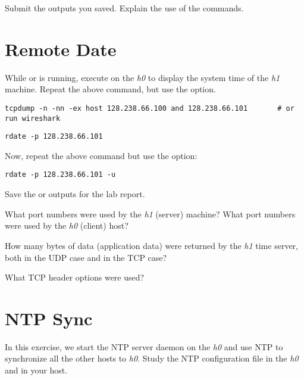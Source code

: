\documentclass{../UTNetLab}
\begin{document}
\begin{report}
    \item Submit the  outputs you saved.
    Explain the use of the commands.
\end{report}

\section{Remote Date}
While  or  is running, execute  on the \textit{h0} to display the system time of the \textit{h1} machine.
Repeat the above  command, but use the  option.

\begin{lstlisting}
tcpdump -n -nn -ex host 128.238.66.100 and 128.238.66.101		# or run wireshark
\end{lstlisting}

\begin{lstlisting}
rdate -p 128.238.66.101
\end{lstlisting}

Now, repeat the above  command but use the  option:

\begin{lstlisting}
rdate -p 128.238.66.101 -u
\end{lstlisting}

Save the  or  outputs for the lab report.

\begin{report}
    \item What port numbers were used by the \textit{h1} (server) machine?
    What port numbers were used by the \textit{h0} (client) host?

    \item How many bytes of data (application data) were returned by the \textit{h1} time server, both in the UDP case and in the TCP case?

    \item What TCP header options were used?
\end{report}

\section{NTP Sync}
In this exercise, we start the NTP server daemon on the \textit{h0} and use NTP to synchronize all the other hosts to \textit{h0}.
Study the NTP configuration file  in the \textit{h0} and in your host.
\end{document}
